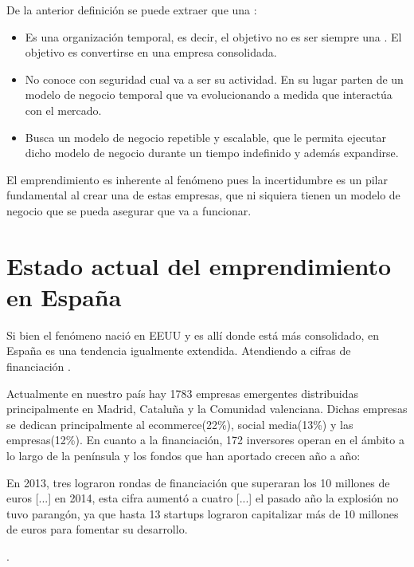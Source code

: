 De la anterior definición se puede extraer que una :
\begin{itemize}
	\item Es una organización temporal, es decir, el objetivo no es ser siempre una . El objetivo es convertirse en una empresa consolidada.
	\item No conoce con seguridad cual va a ser su actividad. En su lugar parten de un modelo de negocio temporal que va evolucionando a medida que interactúa con el mercado.
	\item Busca un modelo de negocio repetible y escalable, que le permita ejecutar dicho modelo de negocio durante un tiempo indefinido y además expandirse.
\end{itemize}
El emprendimiento es inherente al fenómeno  pues la incertidumbre es un pilar fundamental al crear una de estas empresas, que ni siquiera tienen un modelo de negocio que se pueda asegurar que va a funcionar.

\section{Estado actual del emprendimiento en España}

Si bien el fenómeno  nació en EEUU y es allí donde está más consolidado, en España es una tendencia igualmente extendida. Atendiendo a cifras de financiación  \cite{albertoiglesiasfraga2016}.

Actualmente en nuestro país hay 1783 empresas emergentes distribuidas principalmente en Madrid, Cataluña y la Comunidad valenciana. Dichas empresas se dedican principalmente al ecommerce(22\%), social media(13\%) y las empresas(12\%). En cuanto a la financiación, 172 inversores operan en el ámbito  a lo largo de la península \cite{startupxplore2017} y los fondos que han aportado crecen año a año: 

\begin{itquote}
En 2013, tres  lograron rondas de financiación que superaran los 10 millones de euros [...] en 2014, esta cifra aumentó a cuatro [...] el pasado año la explosión no tuvo parangón, ya que hasta 13 startups lograron capitalizar más de 10 millones de euros para fomentar su desarrollo.
\begin{flushright}\cite{albertoiglesiasfraga2016}. \end{flushright}
\end{itquote}

